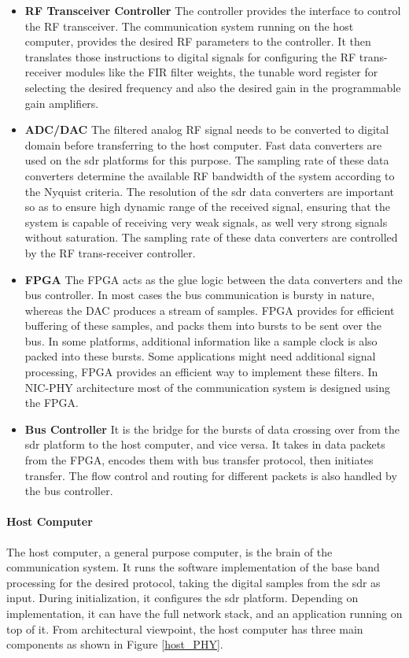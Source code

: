 \begin{itemize}
\item{\textbf{\ac{RF} Transceiver Controller} The controller provides the interface to control the \ac{RF} transceiver.
The communication system running on the host computer, provides the desired RF parameters to the controller.
It then translates those instructions to digital signals for configuring the RF trans-receiver modules like the \ac{FIR} filter weights, the tunable word register for selecting the desired frequency and also the desired gain in the programmable gain amplifiers.
}

\item{\textbf{ADC/DAC} The filtered analog \ac{RF} signal needs to be converted to digital domain before transferring to the host computer.
Fast data converters are used on the \ac{sdr} platforms for this purpose.
The sampling rate of these data converters determine the available \ac{RF} bandwidth of the system according to the Nyquist criteria.
The resolution of the \ac{sdr} data converters are important so as to ensure high dynamic range of the received signal, ensuring that the system is capable of receiving very weak signals, as well very strong signals without saturation.
The sampling rate of these data converters are controlled by the \ac{RF} trans-receiver controller.
}
\item{\textbf{\ac{FPGA}} The \ac{FPGA} acts as the glue logic between the data converters and the bus controller.
In most cases the bus communication is bursty in nature, whereas the \ac{DAC} produces a stream of samples.
\ac{FPGA} provides for efficient buffering of these samples, and packs them into bursts to be sent over the bus.
In some platforms, additional information like a sample clock is also packed into these bursts.
Some applications might need additional signal processing, \ac{FPGA} provides an efficient way to implement these filters.
In NIC-PHY architecture most of the communication system is designed using the \ac{FPGA}.
}
\item{\textbf{Bus Controller} It is the bridge for the bursts of data crossing over from the \ac{sdr} platform to the host computer, and vice versa.
It takes in data packets from the \ac{FPGA}, encodes them with bus transfer protocol, then initiates transfer.
The flow control and routing for different packets is also handled by the bus controller.}
\end{itemize}

\paragraph{Host Computer} The host computer, a general purpose computer, is the brain of the communication system.
It runs the software implementation of the base band processing for the desired protocol, taking the digital samples from the \ac{sdr} as input.
During initialization, it configures the \ac{sdr} platform.
Depending on implementation, it can have the full network stack, and an application running on top of it.
From architectural viewpoint, the host computer has three main components as shown in Figure \ref{host_PHY}.

